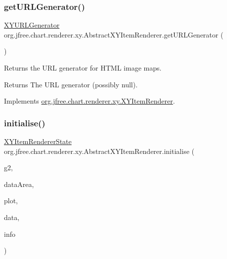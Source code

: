 \subsubsection{\texorpdfstring{get\+U\+R\+L\+Generator()}{getURLGenerator()}}
{\footnotesize\ttfamily \mbox{\hyperlink{interfaceorg_1_1jfree_1_1chart_1_1urls_1_1_x_y_u_r_l_generator}{X\+Y\+U\+R\+L\+Generator}} org.\+jfree.\+chart.\+renderer.\+xy.\+Abstract\+X\+Y\+Item\+Renderer.\+get\+U\+R\+L\+Generator (\begin{DoxyParamCaption}{ }\end{DoxyParamCaption})}

Returns the U\+RL generator for H\+T\+ML image maps.

\begin{DoxyReturn}{Returns}
The U\+RL generator (possibly {\ttfamily null}). 
\end{DoxyReturn}


Implements \mbox{\hyperlink{interfaceorg_1_1jfree_1_1chart_1_1renderer_1_1xy_1_1_x_y_item_renderer_aa4ef599fb2f7154cade595bca496f98a}{org.\+jfree.\+chart.\+renderer.\+xy.\+X\+Y\+Item\+Renderer}}.

\mbox{\label{classorg_1_1jfree_1_1chart_1_1renderer_1_1xy_1_1_abstract_x_y_item_renderer_a42c46a825965289dd60f51b28572ce03}} 
\subsubsection{\texorpdfstring{initialise()}{initialise()}}
{\footnotesize\ttfamily \mbox{\hyperlink{classorg_1_1jfree_1_1chart_1_1renderer_1_1xy_1_1_x_y_item_renderer_state}{X\+Y\+Item\+Renderer\+State}} org.\+jfree.\+chart.\+renderer.\+xy.\+Abstract\+X\+Y\+Item\+Renderer.\+initialise (\begin{DoxyParamCaption}\item[{Graphics2D}]{g2,  }\item[{Rectangle2D}]{data\+Area,  }\item[{\mbox{\hyperlink{classorg_1_1jfree_1_1chart_1_1plot_1_1_x_y_plot}{X\+Y\+Plot}}}]{plot,  }\item[{\mbox{\hyperlink{interfaceorg_1_1jfree_1_1data_1_1xy_1_1_x_y_dataset}{X\+Y\+Dataset}}}]{data,  }\item[{\mbox{\hyperlink{classorg_1_1jfree_1_1chart_1_1plot_1_1_plot_rendering_info}{Plot\+Rendering\+Info}}}]{info }\end{DoxyParamCaption})}

